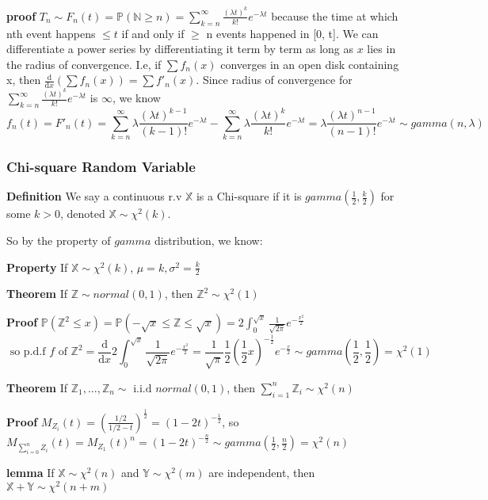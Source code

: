 \documentclass[a4paper,12pt]{article}
\begin{document}
\textbf{proof} $T_n \sim F_n(t) = \mathbb{P}( \mathbb{N} \geq n ) = \sum_{k=n}^\infty \frac{(\lambda t)^k}{k!}e^{-\lambda t}$ because the time at which nth event happens $\leq t$ if and only if $\geq$ n events happened in [0, t]. We can differentiate a power series by differentiating it term by term as long as $x$ lies in the radius of convergence. I.e, if $\sum f_n(x) $ converges in an open disk containing x, then $ \frac{\mathrm{d}}{\mathrm{d} x} ( \sum f_n(x) ) = \sum f'_n(x) $. Since radius of convergence for $\sum_{k=n}^\infty \frac{(\lambda t)^k}{k!}e^{-\lambda t}$ is $\infty$, we know $$f_n(t) = F'_n(t) = \sum_{k=n}^\infty \lambda\frac{(\lambda t)^{k-1}}{(k-1)!}e^{-\lambda t}  - \sum_{k=n}^\infty \lambda\frac{(\lambda t)^k}{k!}e^{-\lambda t} = \lambda\frac{(\lambda t)^{n-1}}{(n-1)!}e^{-\lambda t} \sim gamma(n, \lambda)$$ 

\subsubsection{Chi-square Random Variable }
\textbf{Definition} We say a continuous r.v $\mathbb{X}$ is a Chi-square if it is $gamma( \frac{1}{2}, \frac{k}{2} )$ for some $k > 0$, denoted $\mathbb{X} \sim \chi^2(k)$.

So by the property of $gamma$ distribution, we know:

\textbf{Property} If $\mathbb{X} \sim \chi^2(k)$, $\mu = k, \sigma^2 = \frac{k}{2}$ 

\textbf{Theorem} If $\mathbb{Z} \sim normal(0, 1)$, then $\mathbb{Z}^2 \sim \chi^2(1)$ 

\textbf{Proof} $\mathbb{P}(\mathbb{Z}^2 \leq x) = \mathbb{P}(-\sqrt{x} \leq \mathbb{Z} \leq \sqrt{x}) =  2\int_0^{\sqrt{x}} \frac{1}{\sqrt{2\pi}}e^{-\frac{x^2}{2}} $
$$ \text{ so p.d.f } f \text{ of } \mathbb{Z}^2 = \frac{\mathrm{d}}{\mathrm{d}x}2\int_0^{\sqrt{x}} \frac{1}{\sqrt{2\pi}}e^{-\frac{x^2}{2}} = \frac{1}{\sqrt{\pi}}\frac{1}{2}(\frac{1}{2} x)^{-\frac{1}{2}}e^{-\frac{x}{2}} \sim gamma(\frac{1}{2}, \frac{1}{2}) = \chi^2(1)$$

\textbf{Theorem} If $\mathbb{Z}_1, ..., \mathbb{Z}_n \sim \text{ i.i.d } normal(0, 1)$, then $\sum_{i=1}^n \mathbb{Z}_i \sim \chi^2(n)$ 

\textbf{Proof} $M_{Z_i}(t) = (\frac{1/2}{1/2 - t})^{\frac{1}{2}} = (1-2t)^{-\frac{1}{2}}$, so $M_{\sum_{i=0}^n Z_i}(t) = M_{Z_1}(t)^n = (1-2t)^{-\frac{n}{2}} \sim gamma(\frac{1}{2}, \frac{n}{2}) = \chi^2(n)$ 

\textbf{lemma} If $\mathbb{X} \sim \chi^2(n)$ and $\mathbb{Y} \sim \chi^2(m)$ are independent, then $\mathbb{X}+\mathbb{Y} \sim \chi^2(n+m)$ 
\end{document}
